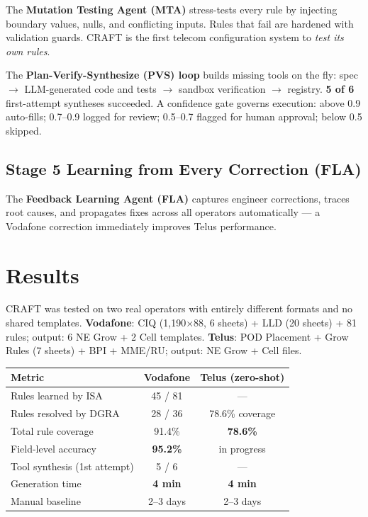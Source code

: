 \documentclass[10.5pt]{article}
\begin{document}
The \textbf{Mutation Testing Agent (MTA)} stress-tests every rule by injecting boundary values, nulls, and conflicting inputs. Rules that fail are hardened with validation guards. CRAFT is the first telecom configuration system to \emph{test its own rules}.

The \textbf{Plan-Verify-Synthesize (PVS) loop} builds missing tools on the fly: spec $\rightarrow$ LLM-generated code and tests $\rightarrow$ sandbox verification $\rightarrow$ registry. \textbf{5 of 6} first-attempt syntheses succeeded. A confidence gate governs execution: above 0.9 auto-fills; 0.7--0.9 logged for review; 0.5--0.7 flagged for human approval; below 0.5 skipped.

\subsection*{Stage 5 \quad Learning from Every Correction (FLA)}

The \textbf{Feedback Learning Agent (FLA)} captures engineer corrections, traces root causes, and propagates fixes across all operators automatically --- a Vodafone correction immediately improves Telus performance.

\section{Results}

CRAFT was tested on two real operators with entirely different formats and no shared templates. \textbf{Vodafone}: CIQ (1,190$\times$88, 6 sheets) + LLD (20 sheets) + 81 rules; output: 6 NE Grow + 2 Cell templates. \textbf{Telus}: POD Placement + Grow Rules (7 sheets) + BPI + MME/RU; output: NE Grow + Cell files.

\vspace{4pt}
\begin{center}
\renewcommand{\arraystretch}{1.35}
\begin{tabular}{lcc}
\toprule
\textbf{Metric} & \textbf{Vodafone} & \textbf{Telus (zero-shot)} \\
\midrule
Rules learned by ISA          & 45 / 81   & ---             \\
Rules resolved by DGRA        & 28 / 36   & 78.6\% coverage \\
Total rule coverage           & 91.4\%    & \textbf{78.6\%} \\
Field-level accuracy          & \textbf{95.2\%} & in progress  \\
Tool synthesis (1st attempt)  & 5 / 6     & ---             \\
Generation time               & \textbf{4 min}  & \textbf{4 min}  \\
Manual baseline               & 2--3 days & 2--3 days       \\
\bottomrule
\end{tabular}
\end{center}
\vspace{4pt}
\end{document}
